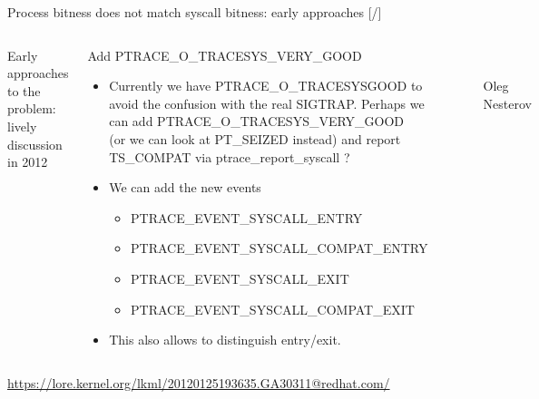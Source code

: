 \documentclass[unicode,aspectratio=169,xcolor={table,dvipsnames,usernames}]{beamer}
\begin{document}
\begin{frame}{Process bitness does not match syscall bitness: early approaches \hfill [\insertframenumber/\inserttotalframenumber]}
\Large
\begin{columns}
	\column{11cm}
		{\large Early approaches to the problem: lively discussion in 2012}
		\begin{block}{Add PTRACE\_O\_TRACESYS\_VERY\_GOOD}
		\large
		\begin{itemize}
			\item Currently we have PTRACE\_O\_TRACESYSGOOD
			to avoid the confusion with the real SIGTRAP.
			Perhaps we can add PTRACE\_O\_TRACESYS\_VERY\_GOOD \\
			(or we can look at PT\_SEIZED instead)
			and report TS\_COMPAT via ptrace\_report\_syscall ?
			\item We can add the new events
			\begin{itemize}
				\item PTRACE\_EVENT\_SYSCALL\_ENTRY
				\item PTRACE\_EVENT\_SYSCALL\_COMPAT\_ENTRY
				\item PTRACE\_EVENT\_SYSCALL\_EXIT
				\item PTRACE\_EVENT\_SYSCALL\_COMPAT\_EXIT
			\end{itemize}
			\item This also allows to distinguish entry/exit.
		\end{itemize}
		\end{block}
	\column{2.5cm}
		\begin{figure}
			\centering
			 \\
			Oleg \\ Nesterov
		\end{figure}
\end{columns}
\bigskip
\tiny
\url{https://lore.kernel.org/lkml/20120125193635.GA30311@redhat.com/}
\end{frame}
\end{document}
